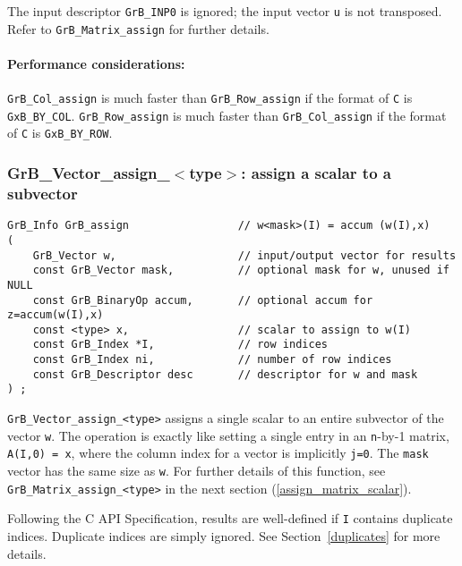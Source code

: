 \documentclass[12pt]{article}
\begin{document}
{The input descriptor \verb'GrB_INP0' is ignored; the input vector \verb'u' is
not transposed.  Refer to \verb'GrB_Matrix_assign' for further details.

\paragraph{\bf Performance considerations:} %
\verb'GrB_Col_assign' is much faster than \verb'GrB_Row_assign' if the format
of \verb'C' is \verb'GxB_BY_COL'.  \verb'GrB_Row_assign' is much faster than
\verb'GrB_Col_assign' if the format of \verb'C' is \verb'GxB_BY_ROW'.

\newpage
\subsubsection{{\sf GrB\_Vector\_assign\_$<$type$>$:} assign a scalar to a subvector}
\label{assign_vector_scalar}

\begin{mdframed}[userdefinedwidth=6in]
{\footnotesize
\begin{verbatim}
GrB_Info GrB_assign                 // w<mask>(I) = accum (w(I),x)
(
    GrB_Vector w,                   // input/output vector for results
    const GrB_Vector mask,          // optional mask for w, unused if NULL
    const GrB_BinaryOp accum,       // optional accum for z=accum(w(I),x)
    const <type> x,                 // scalar to assign to w(I)
    const GrB_Index *I,             // row indices
    const GrB_Index ni,             // number of row indices
    const GrB_Descriptor desc       // descriptor for w and mask
) ;
\end{verbatim} } \end{mdframed}

\verb'GrB_Vector_assign_<type>' assigns a single scalar to an entire subvector
of the vector \verb'w'.  The operation is exactly like setting a single entry
in an \verb'n'-by-1 matrix, \verb'A(I,0) = x', where the column index for a
vector is implicitly \verb'j=0'.  The \verb'mask' vector has the same size as
\verb'w'.  For further details of this function, see
\verb'GrB_Matrix_assign_<type>' in the next section
(\ref{assign_matrix_scalar}).

Following the C API Specification, results are well-defined if \verb'I'
contains duplicate indices.  Duplicate indices are simply ignored.  See
Section~\ref{duplicates} for more details.

}
\end{document}
